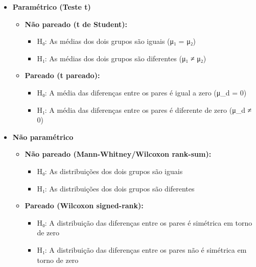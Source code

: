 \documentclass[
]{book}
\providecommand{\tightlist}{%
  \setlength{\itemsep}{0pt}\setlength{\parskip}{0pt}}
\begin{document}
\begin{itemize}
\tightlist
\item
  \textbf{Paramétrico (Teste t)}

  \begin{itemize}
  \tightlist
  \item
    \textbf{Não pareado (t de Student):}

    \begin{itemize}
    \tightlist
    \item
      H₀: As médias dos dois grupos são iguais (μ₁ = μ₂)
    \item
      H₁: As médias dos dois grupos são diferentes (μ₁ ≠ μ₂)
    \end{itemize}
  \item
    \textbf{Pareado (t pareado):}

    \begin{itemize}
    \tightlist
    \item
      H₀: A média das diferenças entre os pares é igual a zero (μ\_d = 0)
    \item
      H₁: A média das diferenças entre os pares é diferente de zero (μ\_d ≠ 0)
    \end{itemize}
  \end{itemize}
\item
  \textbf{Não paramétrico}

  \begin{itemize}
  \tightlist
  \item
    \textbf{Não pareado (Mann-Whitney/Wilcoxon rank-sum):}

    \begin{itemize}
    \tightlist
    \item
      H₀: As distribuições dos dois grupos são iguais
    \item
      H₁: As distribuições dos dois grupos são diferentes
    \end{itemize}
  \item
    \textbf{Pareado (Wilcoxon signed-rank):}

    \begin{itemize}
    \tightlist
    \item
      H₀: A distribuição das diferenças entre os pares é simétrica em torno de zero
    \item
      H₁: A distribuição das diferenças entre os pares não é simétrica em torno de zero
    \end{itemize}
  \end{itemize}
\end{itemize}
\end{document}
